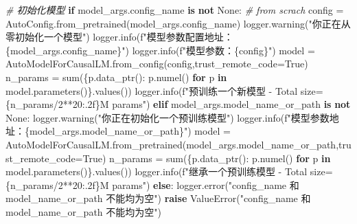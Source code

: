 \documentclass[
]{article}
\newenvironment{Shaded}{}{}
\newcommand{\BuiltInTok}[1]{\textcolor[rgb]{0.00,0.50,0.00}{#1}}
\newcommand{\CommentTok}[1]{\textcolor[rgb]{0.38,0.63,0.69}{\textit{#1}}}
\newcommand{\ControlFlowTok}[1]{\textcolor[rgb]{0.00,0.44,0.13}{\textbf{#1}}}
\newcommand{\DecValTok}[1]{\textcolor[rgb]{0.25,0.63,0.44}{#1}}
\newcommand{\KeywordTok}[1]{\textcolor[rgb]{0.00,0.44,0.13}{\textbf{#1}}}
\newcommand{\NormalTok}[1]{#1}
\newcommand{\OperatorTok}[1]{\textcolor[rgb]{0.40,0.40,0.40}{#1}}
\newcommand{\PreprocessorTok}[1]{\textcolor[rgb]{0.74,0.48,0.00}{#1}}
\newcommand{\SpecialCharTok}[1]{\textcolor[rgb]{0.25,0.44,0.63}{#1}}
\newcommand{\SpecialStringTok}[1]{\textcolor[rgb]{0.73,0.40,0.53}{#1}}
\newcommand{\StringTok}[1]{\textcolor[rgb]{0.25,0.44,0.63}{#1}}
\newcommand{\VariableTok}[1]{\textcolor[rgb]{0.10,0.09,0.49}{#1}}
\begin{document}
\begin{Shaded}
\begin{Highlighting}[]
\CommentTok{\# 初始化模型}
\ControlFlowTok{if}\NormalTok{ model\_args.config\_name }\KeywordTok{is} \KeywordTok{not} \VariableTok{None}\NormalTok{:}
    \CommentTok{\# from scrach}
\NormalTok{    config }\OperatorTok{=}\NormalTok{ AutoConfig.from\_pretrained(model\_args.config\_name)}
\NormalTok{    logger.warning(}\StringTok{"你正在从零初始化一个模型"}\NormalTok{)}
\NormalTok{    logger.info(}\SpecialStringTok{f"模型参数配置地址：}\SpecialCharTok{\{}\NormalTok{model\_args}\SpecialCharTok{.}\NormalTok{config\_name}\SpecialCharTok{\}}\SpecialStringTok{"}\NormalTok{)}
\NormalTok{    logger.info(}\SpecialStringTok{f"模型参数：}\SpecialCharTok{\{}\NormalTok{config}\SpecialCharTok{\}}\SpecialStringTok{"}\NormalTok{)}
\NormalTok{    model }\OperatorTok{=}\NormalTok{ AutoModelForCausalLM.from\_config(config,trust\_remote\_code}\OperatorTok{=}\VariableTok{True}\NormalTok{)}
\NormalTok{    n\_params }\OperatorTok{=} \BuiltInTok{sum}\NormalTok{(\{p.data\_ptr(): p.numel() }\ControlFlowTok{for}\NormalTok{ p }\KeywordTok{in}\NormalTok{ model.parameters()\}.values())}
\NormalTok{    logger.info(}\SpecialStringTok{f"预训练一个新模型 {-} Total size=}\SpecialCharTok{\{}\NormalTok{n\_params}\OperatorTok{/}\DecValTok{2}\OperatorTok{**}\DecValTok{20}\SpecialCharTok{:.2f\}}\SpecialStringTok{M params"}\NormalTok{)}
\ControlFlowTok{elif}\NormalTok{ model\_args.model\_name\_or\_path }\KeywordTok{is} \KeywordTok{not} \VariableTok{None}\NormalTok{:}
\NormalTok{    logger.warning(}\StringTok{"你正在初始化一个预训练模型"}\NormalTok{)}
\NormalTok{    logger.info(}\SpecialStringTok{f"模型参数地址：}\SpecialCharTok{\{}\NormalTok{model\_args}\SpecialCharTok{.}\NormalTok{model\_name\_or\_path}\SpecialCharTok{\}}\SpecialStringTok{"}\NormalTok{)}
\NormalTok{    model }\OperatorTok{=}\NormalTok{ AutoModelForCausalLM.from\_pretrained(model\_args.model\_name\_or\_path,trust\_remote\_code}\OperatorTok{=}\VariableTok{True}\NormalTok{)}
\NormalTok{    n\_params }\OperatorTok{=} \BuiltInTok{sum}\NormalTok{(\{p.data\_ptr(): p.numel() }\ControlFlowTok{for}\NormalTok{ p }\KeywordTok{in}\NormalTok{ model.parameters()\}.values())}
\NormalTok{    logger.info(}\SpecialStringTok{f"继承一个预训练模型 {-} Total size=}\SpecialCharTok{\{}\NormalTok{n\_params}\OperatorTok{/}\DecValTok{2}\OperatorTok{**}\DecValTok{20}\SpecialCharTok{:.2f\}}\SpecialStringTok{M params"}\NormalTok{)}
\ControlFlowTok{else}\NormalTok{:}
\NormalTok{    logger.error(}\StringTok{"config\_name 和 model\_name\_or\_path 不能均为空"}\NormalTok{)}
    \ControlFlowTok{raise} \PreprocessorTok{ValueError}\NormalTok{(}\StringTok{"config\_name 和 model\_name\_or\_path 不能均为空"}\NormalTok{)}
\end{Highlighting}
\end{Shaded}
\end{document}
